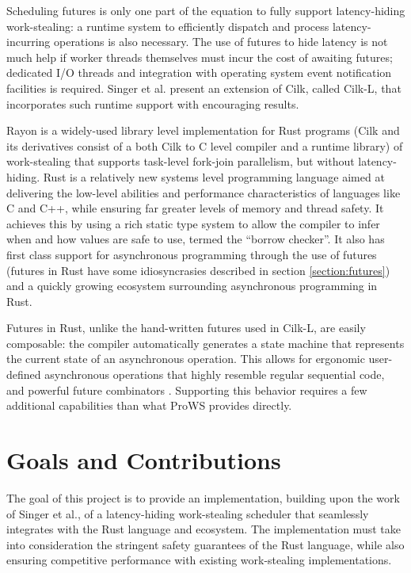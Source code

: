 \documentclass[bsc,frontabs,singlespacing,parskip,deptreport,normalheadings]{infthesis}
\begin{document}
Scheduling futures is only one part of the equation to fully support
latency-hiding work-stealing: a runtime system to efficiently dispatch and
process latency-incurring operations is also necessary. The use of futures to
hide latency is not much help if worker threads themselves must incur the cost
of awaiting futures; dedicated I/O threads and integration with operating system
event notification facilities is required. Singer et al.
\cite{singer_scheduling_2019} present an extension of Cilk, called Cilk-L, that
incorporates such runtime support with encouraging results.

Rayon \cite{noauthor_rayon_2022, noauthor_baby_nodate, stone_how_2021} is a
widely-used library level implementation for Rust programs (Cilk and its
derivatives consist of a both Cilk to C level compiler and a runtime library) of
work-stealing that supports task-level fork-join parallelism, but without
latency-hiding. Rust \cite{matsakis_rust_2014} is a relatively new systems level
programming language aimed at delivering the low-level abilities and performance
characteristics of languages like C and C++, while ensuring far greater levels
of memory and thread safety. It achieves this by using a rich static type system
to allow the compiler to infer when and how values are safe to use, termed the
``borrow checker''. It also has first class support for asynchronous programming
through the use of futures (futures in Rust have some idiosyncrasies described
in section \ref{section:futures}) and a quickly growing ecosystem surrounding
asynchronous programming in Rust.

Futures in Rust, unlike the hand-written futures used in Cilk-L, are easily
composable: the compiler automatically generates a state machine that represents
the current state of an asynchronous operation. This allows for ergonomic
user-defined asynchronous operations that highly resemble regular sequential
code, and powerful future combinators \cite{noauthor_futuresfuture_nodate}.
Supporting this behavior requires a few additional capabilities than what ProWS
provides directly.

\section{Goals and Contributions}

The goal of this project is to provide an implementation, building upon the work
of Singer et al., of a latency-hiding work-stealing scheduler that seamlessly
integrates with the Rust language and ecosystem. The implementation must take
into consideration the stringent safety guarantees of the Rust language, while
also ensuring competitive performance with existing work-stealing
implementations.
\end{document}
